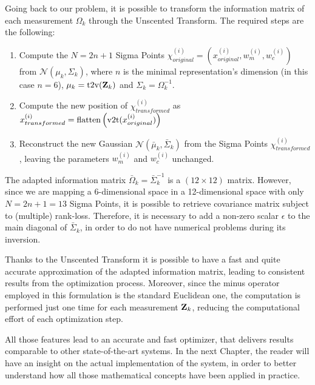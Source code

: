 Going back to our problem, it is possible to transform the information matrix of each measurement $\Omega_k$ through the Unscented Transform. The required steps are the following:

\begin{enumerate}
    \item Compute the $N = 2n+1$ Sigma Points $\chi_{original}^{(i)} = (x_{original}^{(i)}, w_m^{(i)}, w_c^{(i)})$ from $\mathcal{N}(\mu_k, \Sigma_k)$, where $n$ is the minimal representation's dimension (in this case $n = 6$), $\mu_k = \text{t2v}(\mathbf{Z}_{k})$ and $\Sigma_k = \Omega_k^{-1}$.
    \item Compute the new position of $\chi_{transformed}^{(i)}$ as $x_{transformed}^{(i)} = \flatten{\v2t(x_{original}^{(i)})}$
    \item Reconstruct the new Gaussian $\mathcal{N}(\bar{\mu}_k, \bar{\Sigma}_k)$ from the Sigma Points $\chi_{transformed}^{(i)}$, leaving the parameters $w_m^{(i)}$ and $w_c^{(i)}$ unchanged.
\end{enumerate}

The adapted information matrix $\bar{\Omega}_k = \bar{\Sigma}_k^{-1}$ is a $(12\times12)$ matrix. However, since we are mapping a 6-dimensional space in a 12-dimensional space with only $N = 2n + 1 = 13$ Sigma Points, it is possible to retrieve covariance matrix subject to (multiple) rank-loss. Therefore, it is necessary to add a non-zero scalar $\epsilon$ to the main diagonal of $\bar{\Sigma}_k$, in order to do not have numerical problems during its inversion.

Thanks to the Unscented Transform it is possible to have a fast and quite accurate approximation of the adapted information matrix, leading to consistent results from the optimization process. Moreover, since the minus operator employed in this formulation is the standard Euclidean one, the computation is performed just one time for each measurement $\mathbf{Z}_{k}$, reducing the computational effort of each optimization step.

\vspace{15px}

All those features lead to an accurate and fast optimizer, that delivers results comparable to other state-of-the-art systems. In the next Chapter, the reader will have an insight on the actual implementation of the system, in order to better understand how all those mathematical concepts have been applied in practice.